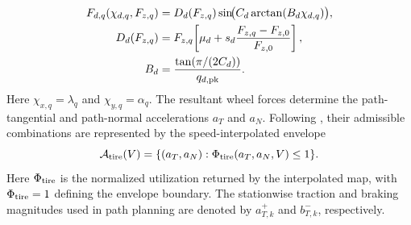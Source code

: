 \documentclass[journal,twoside,web]{ieeecolor}
\begin{document}
\begin{equation}
\begin{aligned}
F_{d,q}(\chi_{d,q},F_{z,q})
&=D_d(F_{z,q})\sin\!\bigl(C_d\arctan(B_d\chi_{d,q})\bigr),\\
D_d(F_{z,q})&=F_{z,q}\!\left[\mu_d+s_d
\frac{F_{z,q}-F_{z,0}}{F_{z,0}}\right],\\
B_d&=\frac{\tan\!\left(\pi/(2C_d)\right)}{q_{d,\rm pk}}.
\end{aligned}
\label{eq:tire_force_model}
\end{equation}
Here $\chi_{x,q}=\lambda_q$ and $\chi_{y,q}=\alpha_q$. The resultant wheel
forces determine the path-tangential and path-normal accelerations $a_T$ and
$a_N$. Following \cite{veneri2020free}, their admissible combinations are
represented by the speed-interpolated envelope
\begin{equation}
\mathcal A_{\rm tire}(V)
=\{(a_T,a_N):\Phi_{\rm tire}(a_T,a_N,V)\le1\}.
\label{eq:tire_accel_envelope}
\end{equation}
Here $\Phi_{\rm tire}$ is the normalized utilization returned by the
interpolated map, with $\Phi_{\rm tire}=1$ defining the envelope boundary.
The stationwise traction and braking magnitudes used in path planning are
denoted by $a_{T,k}^{+}$ and $b_{T,k}^{-}$, respectively.
\end{document}
